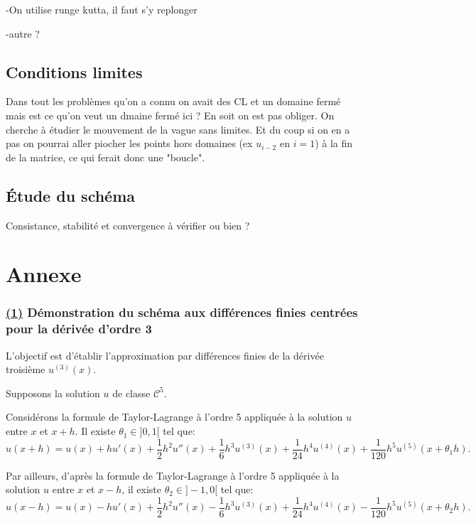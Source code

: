 \documentclass[12pt,a4paper]{article}
\begin{document}
-On utilise runge kutta, il faut s'y replonger

-autre ? 


\subsection{Conditions limites}

Dans tout les problèmes qu'on a connu on avait des CL et un domaine fermé mais est ce qu'on veut un dmaine fermé ici ? En soit on est pas obliger. On cherche à étudier le mouvement de la vague sans limites. 
Et du coup si on en a pas on pourrai aller piocher les points hors domaines (ex $u_{i-2}$ en $i=1$) à la fin de la matrice, ce qui ferait donc une "boucle". 

\subsection{Étude du schéma}

Consistance, stabilité et convergence à vérifier ou bien ? 

\newpage

\section*{Annexe}
\label{annexe:demo1}
\subsubsection*{\hyperref[main:demo1]{(1)} Démonstration du schéma aux différences finies centrées pour la dérivée d'ordre 3}

L'objectif est d'établir l'approximation par différences finies de la dérivée troisième $u^{(3)}(x)$.

Supposons la solution $u$ de classe $\mathcal{C}^5$.

Considérons la formule de Taylor-Lagrange à l'ordre 5 appliquée à la solution $u$ entre $x$ et $x+h$. Il existe $\theta_1 \in ]0,1[$ tel que:
\begin{equation}
u(x+h) = u(x) + h u'(x) + \frac{1}{2}h^2 u''(x) + \frac{1}{6}h^3 u^{(3)}(x) + \frac{1}{24}h^4 u^{(4)}(x) + \frac{1}{120}h^5 u^{(5)}(x+\theta_1 h). \label{eq:t+}
\end{equation}

Par ailleurs, d'après la formule de Taylor-Lagrange à l'ordre 5 appliquée à la solution $u$ entre $x$ et $x-h$, il existe $\theta_2 \in ]-1,0[$ tel que:
\begin{equation}
u(x-h) = u(x) - h u'(x) + \frac{1}{2}h^2 u''(x) - \frac{1}{6}h^3 u^{(3)}(x) + \frac{1}{24}h^4 u^{(4)}(x) - \frac{1}{120}h^5 u^{(5)}(x+\theta_2 h). \label{eq:t-}
\end{equation}
\end{document}
